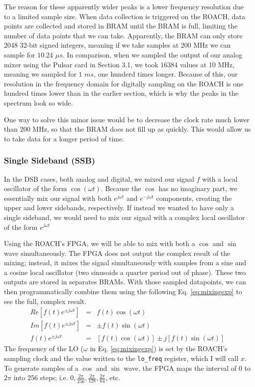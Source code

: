 \documentclass[12pt]{article}
\begin{document}
The reason for these apparently wider peaks is a lower frequency resolution due to a limited sample size. When data collection is triggered on the ROACH, data points are collected and stored in BRAM until the BRAM is full, limiting the number of data points that we can take. Apparently, the BRAM can only store 2048 32-bit signed integers, meaning if we take samples at $200$ MHz we can sample for $10.24$ $\mu s$. In comparison, when we sampled the output of our analog mixer using the Pulsar card in Section 3.1, we took 16384 values at $10$ MHz, meaning we sampled for $1$ $ms$, one hunderd times longer. Because of this, our resolution in the frequency domain for digitally sampling on the ROACH is one hundred times lower than in the earlier section, which is why the peaks in the spectrum look so wide.

One way to solve this minor issue would be to decrease the clock rate much lower than $200$ MHz, so that the BRAM does not fill up as quickly. This would allow us to take data for a longer period of time.



\subsubsection{Single Sideband (SSB)}
In the DSB cases, both analog and digital, we mixed our signal $f$ with a local oscillator of the form $\cos(\omega t)$. Because the $\cos$ has no imaginary part, we essentially mix our signal with both $e^{j \omega t}$ and $e^{-j \omega t}$ components, creating the upper and lower sidebands, respectively. If instead we wanted to have only a single sideband, we would need to mix our signal with a complex local oscillator of the form $e^{j \omega t}$

Using the ROACH's FPGA, we will be able to mix with both a $\cos$ and $\sin$ wave simultaneously. The FPGA does not output the complex result of the mixing; instead, it mixes the signal simultaneously with samples from a sine and a cosine local oscillator (two sinusoids a quarter period out of phase). These two outputs are stored in separates BRAMs. With those sampled datapoints, we can then programmatically combine them using the following Eq. \ref{eq:mixingexp} to see the full, complex result.
\begin{eqnarray}
Re[f(t) e^{\pm j\omega t}] &=& f(t) \cos(\omega t)\nonumber\\
Im[f(t) e^{\pm j\omega t}] &=& \pm f(t) \sin(\omega t) \nonumber\\
f(t) e^{\pm j\omega t} &=& [f(t) \cos(\omega t)] \pm j [f(t) \sin(\omega t)] \label{eq:mixingexp}
\end{eqnarray}
The frequency of the LO ($\omega$ in Eq. \ref{eq:mixingexp}) is set by the ROACH's sampling clock and the value written to the \texttt{lo\_freq} register, which I will call $x$. To generate samples of a $\cos$ and $\sin$ wave, the FPGA maps the interval of $0$ to $2\pi$ into 256 steps; i.e. $0, \frac{2\pi}{256}, \frac{2\pi}{128}, \frac{2\pi}{64}$, etc. 
\end{document}

